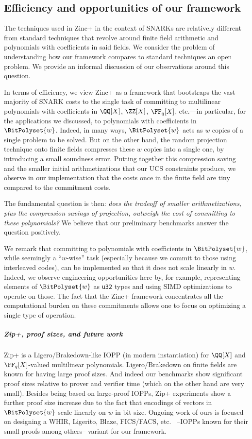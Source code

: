 \subsection{Efficiency and opportunities of our framework}\label{ss:zinc-crypto-efficiency-discussion}
The techniques used in Zinc+ in the context of SNARKs are relatively different from standard techniques that revolve around finite field arithmetic and polynomials with coefficients in said fields. We consider the problem of understanding how our framework compares to standard techniques an open problem. We provide an informal discussion of our observations around this question.

In terms of efficiency, we view Zinc+ as a framework that bootstraps the vast majority of SNARK costs to the single task of committing to multilinear polynomials with coefficients in $\QQ[X]$, $\ZZ[X]$, $\FF_q[X]$, etc.---in particular, for the applications we discussed, to polynomials with coefficients in $\BitPolyset{w}$. Indeed, in many ways, $\BitPolyset{w}$ acts as $w$ copies of a single problem to be solved. But on the other hand, the random projection technique onto finite fields compresses these $w$ copies into a single one, by introducing a small soundness error. Putting together this compression saving and the smaller initial arithmetizations that our UCS constraints produce, we observe in our implementation that the costs once in the finite field are tiny compared to the commitment costs. 

The fundamental question is then: \emph{does the tradeoff of smaller arithmetizations, plus the compression savings of projection, outweigh the cost of committing to these polynomials?} We believe that our preliminary benchmarks answer the question positively. 

We remark that committing to polynomials with coefficients in $\BitPolyset{w}$, while seemingly a ``$w$-wise'' task (especially because we commit to those using interleaved codes), can be implemented so that it does not scale linearly in $w$. Indeed, we observe engineering opportunities here by, for example, representing elements of $\BitPolyset{w}$ as \texttt{u32} types and using SIMD optimizations to operate on those. The fact that the Zinc+ framework concentrates all the computational burden on these commitments allows one to focus on optimizing a single type of operation. 

\subparagraph{Zip+, proof sizes, and future work} Zip+ is a Ligero/Brakedown-like IOPP (in modern instantiation) for $\QQ[X]$ and $\FF_q[X]$-valued multilinear polynomials.  Ligero/Brakedown on finite fields are known for having large proof sizes. And indeed our benchmarks show significant proof sizes relative to prover and verifier time (which on the other hand are very small). Besides being based on large-proof IOPPs, Zip+ experiments show a further proof size increase due to the fact that encodings of vectors in $\BitPolyset{w}$ scale linearly on $w$ in bit-size.  Ongoing work of ours is focused on designing a WHIR, Ligerito, Blaze, FICS/FACS, etc.\ \cite{whir, Ligerito, blaze, FICS-FACS} --IOPPs known for their small proofs among others-- variant for our framework. 



